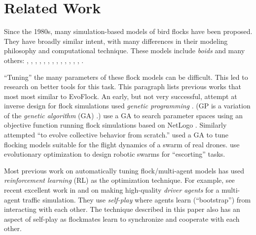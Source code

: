 \documentclass[letterpaper]{article}
\begin{document}
\section{Related Work}
\label{sec:related}

Since the 1980s, many simulation-based models of bird flocks have been proposed. They have broadly similar intent, with many differences in their modeling philosophy and computational technique. These models include \textit{boids} and many others:
\citet{aoki_simulation_1982}, 
\citet{akira_okubo_dynamical_1986}, 
\citet{reynolds_flocks_1987},
\citet{heppner_stochastic_1990}, 
\citet{tu_artificial_1994},
\citet{vicsek_novel_1995},
\citet{toner_flocks_1998}, 
\citet{couzin_collective_2002},
\citet{bajec_simulating_2005},
\citet{cucker_emergent_2007},
\citet{moskon_fuzzy_2007},
\citet{cavagna_seventh_2008},
\citet{bajec_organized_2009},
\citet{bhattacharya_collective_2010}
\citet{vasarhelyi_optimized_2018}
\citet{hoetzlein_flock2_2024}.

``Tuning'' the many parameters of these flock models can be difficult. This led to research on better tools for this task. This paragraph lists previous works that most most similar to EvoFlock. An early, but not very successful, attempt at inverse design for flock simulations \citep{reynolds_evolved_1993} used \textit{genetic programming} \citep{koza_genetic_1992}. (GP is a variation of the \textit{genetic algorithm} (GA) \citep{holland_adaptation_1975}.) \citet{stonedahl_finding_2011} use a GA to search parameter spaces using an objective function running flock simulations based on NetLogo \citep{tisue_netlogo_2004}. Similarly \citet{demsar_evolution_2017} attempted ``to evolve collective behavior from scratch.'' \citet{vasarhelyi_optimized_2018} used a GA to tune flocking models suitable for the flight dynamics of a swarm of real drones. \citet{stolfi_escorting_2025} use evolutionary optimization to design robotic swarms for ``escorting'' tasks.

Most previous work on automatically tuning flock/multi-agent models has used \textit{reinforcement learning} (RL) \citep{sutton_reinforcement_1998} as the optimization technique. For example, see recent excellent work in \citet{cornelisse_building_2025} and \citet{cusumano-towner_robust_2025} on making high-quality \textit{driver agents} for a multi-agent traffic simulation. They use \textit{self-play} where agents learn (``bootstrap'') from interacting with each other. The technique described in this paper also has an aspect of self-play as flockmates learn to synchronize and cooperate with each other.
\end{document}
